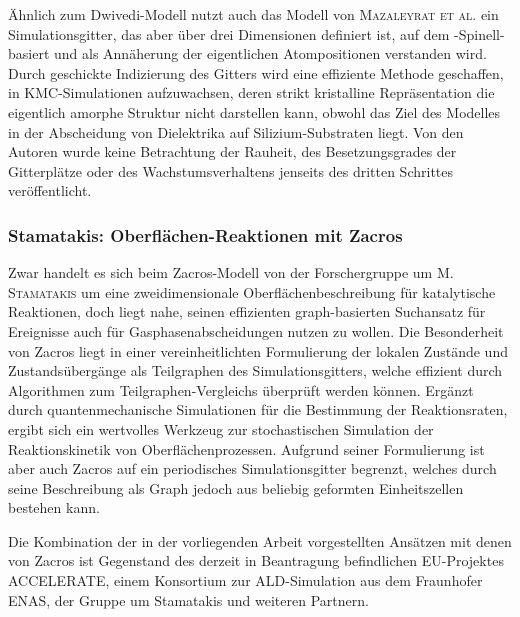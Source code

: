 Ähnlich zum Dwivedi-Modell nutzt auch das Modell von \textsc{Mazaleyrat et al.}\cite{mazaleyrat_methodology_2005} ein Simulationsgitter, das aber über drei Dimensionen definiert ist, auf dem -Spinell-basiert und als Annäherung der eigentlichen Atompositionen verstanden wird.
Durch geschickte Indizierung des Gitters wird eine effiziente Methode geschaffen,  in KMC-Simulationen aufzuwachsen, deren strikt kristalline Repräsentation die eigentlich amorphe Struktur nicht darstellen kann, obwohl das Ziel des Modelles in der Abscheidung von Dielektrika auf Silizium-Substraten liegt.
Von den Autoren wurde keine Betrachtung der Rauheit, des Besetzungsgrades der Gitterplätze oder des Wachstumsverhaltens jenseits des dritten Schrittes veröffentlicht.

\subsubsection{Stamatakis: Oberflächen-Reaktionen mit Zacros}

Zwar handelt es sich beim Zacros-Modell von der Forschergruppe um \textsc{M. Stamatakis}\cite{stamatakis_graph-theoretical_2011,nielsen_parallel_2013,stamatakis_zacros_2014} um eine zweidimensionale Oberflächenbeschreibung für katalytische Reaktionen, doch liegt nahe, seinen effizienten graph-basierten Suchansatz für Ereignisse auch für Gasphasenabscheidungen nutzen zu wollen.
Die Besonderheit von Zacros liegt in einer vereinheitlichten Formulierung der lokalen Zustände und Zustandsübergänge als Teilgraphen des Simulationsgitters, welche effizient durch Algorithmen zum Teilgraphen-Vergleichs überprüft werden können.
Ergänzt durch quantenmechanische Simulationen für die Bestimmung der Reaktionsraten, ergibt sich ein wertvolles Werkzeug zur stochastischen Simulation der Reaktionskinetik von Oberflächenprozessen.
Aufgrund seiner Formulierung ist aber auch Zacros auf ein periodisches Simulationsgitter begrenzt, welches durch seine Beschreibung als Graph jedoch aus beliebig geformten Einheitszellen bestehen kann.

Die Kombination der in der vorliegenden Arbeit vorgestellten Ansätzen mit denen von Zacros ist Gegenstand des derzeit in Beantragung befindlichen EU-Projektes ACCELERATE, einem Konsortium zur ALD-Simulation aus dem Fraunhofer ENAS, der Gruppe um Stamatakis und weiteren Partnern.

